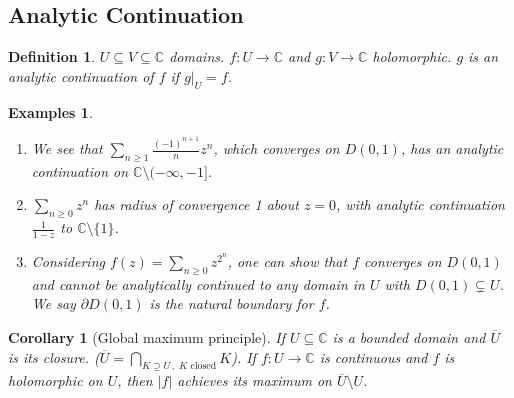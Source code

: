 \documentclass{article}
\theoremstyle{plain}\theoremheaderfont{\normalfont\itshape}\theorembodyfont{\rmfamily}\theoremseparator{.}\newtheorem*{rem}{Remark}\newtheorem*{ex}{Example}\newtheorem*{proof}{Proof}\newtheorem*{altp}{Alternative proof}\newtheorem*{con}{Consequences}\newtheorem*{notn}{Notations}\newtheorem*{cau}{Caution}\newtheorem*{term}{Terminology}\newtheorem*{keyex}{Key example}
\theoremstyle{plain}\theoremheaderfont{\normalfont\bfseries}\theorembodyfont{\rmfamily}\theoremseparator{.}\newtheorem{thm}{Theorem}[section]\newtheorem{lem}[thm]{Lemma}\newtheorem{prop}[thm]{Proposition}\newtheorem*{cor}{Corollary}\newtheorem{defn}[thm]{Definition}\newtheorem{clm}[thm]{Claim}\newtheorem{clminproof}{Claim}\newtheorem{leminproof}{Lemma}\newtheorem{app}{Application}
\theoremstyle{break}\theoremheaderfont{\normalfont\itshape}\theorembodyfont{\rmfamily}\theoremseparator{.\medskip}\newtheorem*{proofskip}{Proof}\newtheorem*{exs}{Examples}\newtheorem*{rems}{Remarks}\newtheorem*{rec}{Recall}\newtheorem*{ppts}{Properties}
\theoremstyle{break}\theoremheaderfont{\normalfont\bfseries}\theorembodyfont{\rmfamily}\theoremseparator{.\medskip}\newtheorem{lemskip}[thm]{Lemma}\newtheorem{defnskip}[thm]{Definition}\newtheorem{propskip}[thm]{Proposition}\newtheorem{thmskip}[thm]{Theorem}
\numberwithin{equation}{section}
\newcommand{\abs}[1]{\left|#1\right|}
\newcommand{\CC}{\mathbb{C}}
\begin{document}
    \subsection{Analytic Continuation}
    \begin{defn}
        \(U\subseteq V\subseteq \CC\) domains. \(f:U\to\CC\) and \(g:V\to\CC\) holomorphic. \(g\) is an \textit{analytic continuation} of \(f\) if \(g|_{U}=f\).
    \end{defn}
    \begin{exs}
        \begin{enumerate}[topsep=0pt,label=(\roman*)]
            \item We see that \(\sum_{n\ge 1}\frac{(-1)^{n+1}}{n}z^n\), which converges on \(D(0,1)\), has an analytic continuation on \(\CC\setminus(-\infty,-1]\).
            \item \(\sum_{n\ge 0}z^n\) has radius of convergence 1 about \(z=0\), with analytic continuation \(\frac{1}{1-z}\) to \(\CC\setminus\{1\}\).
            \begin{figure}[ht!]
                \centering
            \end{figure}
            \item Considering \(f(z)=\sum_{n\ge 0}z^{2^n}\), one can show that \(f\) converges on \(D(0,1)\) and cannot be analytically continued to any domain in \(U\) with \(D(0,1)\subsetneq U\). We say \(\partial D(0,1)\) is the natural boundary for \(f\).
        \end{enumerate}
    \end{exs}
    \begin{cor}[Global maximum principle]
        If \(U\subseteq\CC\) is a bounded domain and \(\overline{U}\) is its closure. (\(\overline{U}=\bigcap_{K\supseteq U\,,\;K\text{ closed}}K\)). If \(f:U\to\CC\) is continuous and \(f\) is holomorphic on \(U\), then \(\abs{f}\) achieves its maximum on \(\overline{U}\setminus U\).
    \end{cor}
\end{document}
